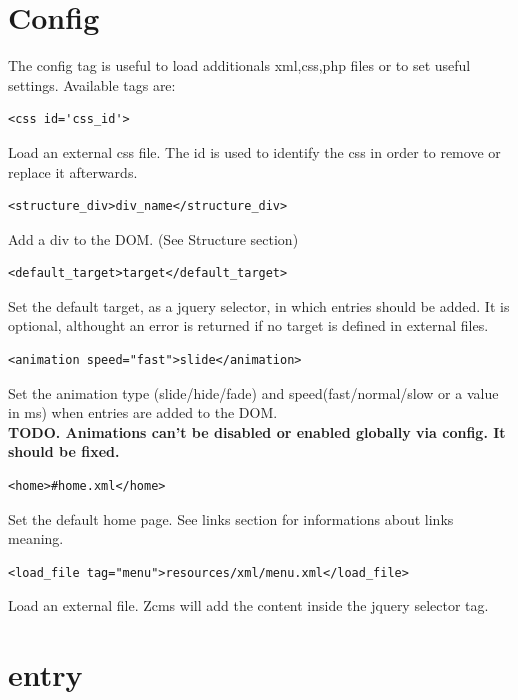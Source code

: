 \documentclass[a4paper,12pt]{article}
\begin{document}
\section{Config}
The config tag is useful to load additionals xml,css,php files or to set useful settings. Available tags are:
\begin{list}{-}{}
\item \begin{verbatim}
<css id='css_id'>       
      \end{verbatim}
Load an external css file. The id is used to identify the css in order to remove or replace it afterwards.
\item \begin{verbatim}
<structure_div>div_name</structure_div>       
      \end{verbatim}
Add a div to the DOM. (See Structure section)
\item \begin{verbatim}
<default_target>target</default_target>       
      \end{verbatim}
Set the default target, as a jquery selector, in which entries should be added. It is optional, althought an error is returned if no target is defined in external files.
\item \begin{verbatim}
<animation speed="fast">slide</animation>
      \end{verbatim}
Set the animation type (slide/hide/fade) and speed(fast/normal/slow or a value in ms) when entries are added to the DOM.\\
\bfseries{TODO}. \normalfont Animations can't be disabled or enabled globally via config. It should be fixed.
\item \begin{verbatim}
<home>#home.xml</home>
      \end{verbatim}
Set the default home page. See links section for informations about links meaning.
\item \begin{verbatim}
<load_file tag="menu">resources/xml/menu.xml</load_file>
      \end{verbatim}
Load an external file. Zcms will add the content inside the jquery selector tag.
\end{list}

\section{entry}
\end{document}
